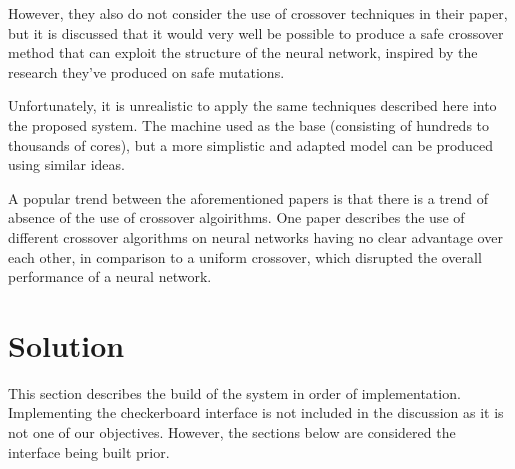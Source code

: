 \documentclass[12pt,a4paper]{article}
\begin{document}
        However, they also do not consider the use of crossover techniques in their paper, but it is discussed that it would very well be possible to produce a safe crossover method that can exploit the structure of the neural network, inspired by the research they've produced on safe mutations.

        Unfortunately, it is unrealistic to apply the same techniques described here into the proposed system. The machine used as the base (consisting of hundreds to thousands of cores), but a more simplistic and adapted model can be produced using similar ideas. 
        
        A popular trend between the aforementioned papers is that there is a trend of absence of the use of crossover algoirithms. One paper describes the use of different crossover algorithms on neural networks having no clear advantage over each other, in comparison to a uniform crossover, which disrupted the overall performance of a neural network. \cite{emmanoulidis_comparison_2000}

\section{Solution}


 
    This section describes the build of the system in order of implementation. Implementing the checkerboard interface is not included in the discussion as it is not one of our objectives. However, the sections below are considered the interface being built prior. 
\end{document}
